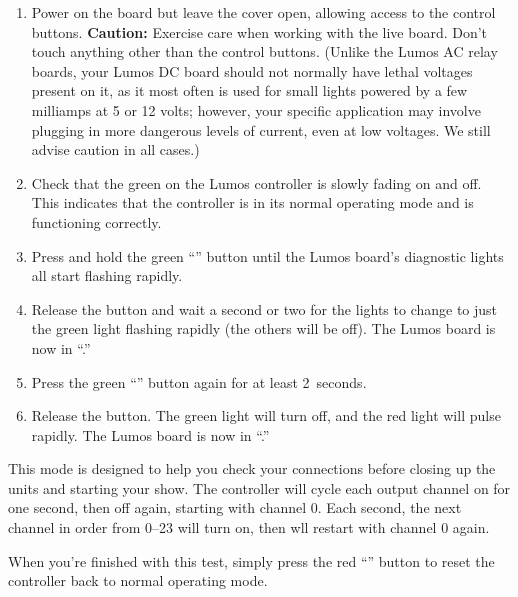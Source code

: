 \documentclass[letterpaper,twoside,onecolumn,openright,final]{memoir}
\begin{document}
\begin{enumerate}
	\item	Power on the board but leave the cover open, allowing access to the control buttons.
		{\bfseries Caution:} Exercise care when working with the live board.  Don't touch anything
		other than the control buttons.  (Unlike the Lumos AC relay boards, your Lumos DC board
		should not normally have lethal voltages present on it, as it most often is used for small
		 lights powered by a few milliamps at 5 or 12 volts; however, your specific application
		may involve plugging in more dangerous levels of current, even at low voltages.  We still 
		advise caution in all cases.)

	\item	Check that the green  on the Lumos controller is slowly fading on and off.  This indicates
		that the controller is in its normal operating mode and is functioning correctly.

	\item	Press and hold the green ``{}'' button until the Lumos board's diagnostic lights all start
		flashing rapidly.

	\item	Release the button and wait a second or two for the lights to change to just the green light
		flashing rapidly (the others will be off).  
		The Lumos board is now in ``.''

	\item	Press the green ``{}'' button again for at least 2~seconds.

	\item	Release the button.  The green light will turn off, and the red light will pulse rapidly.
		The Lumos board is now in ``.''
\end{enumerate}

This mode is designed to help you check your connections before closing up the units and starting your
show.  The controller will cycle each output channel on for one second, then off again, starting with channel 0.  
Each second, the next channel in order from 0--23 will turn on, then wll restart with channel 0 again.

When you're finished with this test, simply press the red ``'' button to reset the controller
back to normal operating mode.
\end{document}
